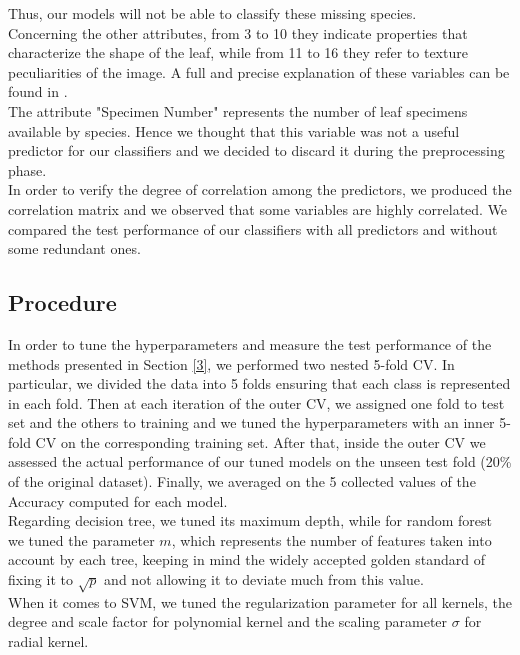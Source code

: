 \documentclass{article}
\begin{document}
Thus, our models will not be able to classify these missing species.
\\ Concerning the other attributes, from 3 to 10 they indicate properties that characterize the shape of the leaf, while from 11 to 16 they refer to texture peculiarities of the image. A full and precise explanation of these variables can be found in \cite{silva}.
\\The attribute "Specimen Number" represents the number of leaf specimens available by species. Hence we thought that this variable was not a useful predictor for our classifiers and we decided to discard it during the preprocessing phase.
\\In order to verify the degree of correlation among the predictors, we produced the correlation matrix and we observed that some variables are highly correlated. We compared the test performance of our classifiers with all predictors and without some redundant ones.

\subsection{Procedure}
In order to tune the hyperparameters and measure the test performance of the methods presented in Section \ref{3}, we performed two nested 5-fold CV. 
In particular, we divided the data into 5 folds ensuring that each class is represented in each fold. Then at each iteration of the outer CV, we assigned one fold to test set and the others to training and we tuned the hyperparameters with an inner 5-fold CV on the corresponding training set. After that, inside the outer CV we assessed the actual performance of our tuned models on the unseen test fold (20\% of the original dataset). Finally, we averaged on the 5 collected values of the Accuracy computed for each model.
\\Regarding decision tree, we tuned its maximum depth, while for random forest we tuned the parameter $m$, which represents the number of features taken into account by each tree, keeping in mind the widely accepted golden standard of fixing it to $\sqrt{p}$ and not allowing it to deviate much from this value.
\\When it comes to SVM, we tuned the regularization parameter for all kernels, the degree and scale factor for polynomial kernel and the scaling parameter $\sigma$ for radial kernel.
\end{document}
